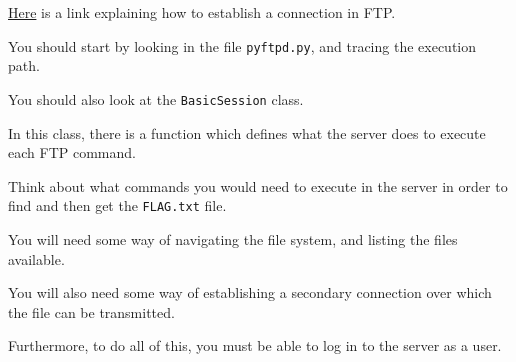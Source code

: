 {{{                    \href{https://www.serv-u.com/resource/tutorial/pasv-response-epsv-port-pbsz-rein-ftp-command#fac52a38-7ddb-4815-a9dc-72cc03c0a8e6}{Here} is a link explaining how to establish a connection in FTP.















                    You should start by looking in the file \lstinline`pyftpd.py`, and tracing the execution path. %







You should also look at the \lstinline`BasicSession` class. %







In this class, there is a function which defines what the server does to execute each FTP command. %







Think about what commands you would need to execute in the server in order to find and then get the \lstinline`FLAG.txt` file. 















                    You will need some way of navigating the file system, and listing the files available. %







You will also need some way of establishing a secondary connection over which the file can be transmitted. %







Furthermore, to do all of this, you must be able to log in to the server as a user. 















}}}
